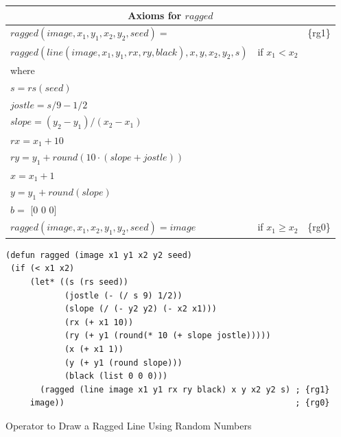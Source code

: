 \begin{figure}
\begin{center}
\begin{spacing}{0.9}
\begin{tabular}{lll}
\multicolumn{3}{c}{Axioms for $ragged$}\\
\hline
$ragged(image, x_1, y_1, x_2, y_2, seed) =$  &&\{rg1\}\\
\hspace*{8mm}$ragged(line(image, x_1, y_1, rx, ry, black), x, y, x_2, y_2, s)$ & if $x_1 < x_2$ &\\
\hspace*{4mm}where &&\\
\hspace*{4mm}$s = rs(seed)$    &&\\
\hspace*{4mm}$jostle = s/9 - 1/2$    &&\\
\hspace*{4mm}$slope = (y_2 - y_1)/(x_2 - x_1)$    &&\\
\hspace*{4mm}$rx = x_1 + 10$     &&\\
\hspace*{4mm}$ry = y_1 + round(10\cdot(slope + jostle))$ &&\\
\hspace*{4mm}$x = x_1 + 1$     &&\\
\hspace*{4mm}$y = y_1 + round(slope)$ &&\\
\hspace*{4mm}$b =$ \textsf{[0 0 0]} &&\\
$ragged(image, x_1, x_2, y_1, y_2, seed) = image$ & if $x_1 \geq x_2$ &\{rg0\}\\
\end{tabular}
\end{spacing}
\begin{code}
\begin{verbatim}
(defun ragged (image x1 y1 x2 y2 seed)
 (if (< x1 x2)
     (let* ((s (rs seed))
            (jostle (- (/ s 9) 1/2))
            (slope (/ (- y2 y2) (- x2 x1)))
            (rx (+ x1 10))
            (ry (+ y1 (round(* 10 (+ slope jostle)))))
            (x (+ x1 1))
            (y (+ y1 (round slope)))
            (black (list 0 0 0)))
       (ragged (line image x1 y1 rx ry black) x y x2 y2 s) ; {rg1}
     image))                                               ; {rg0}
\end{verbatim}
\end{code}
\end{center}
\caption{Operator to Draw a Ragged Line Using Random Numbers}
\label{fig:ragged-defun}
\end{figure}

